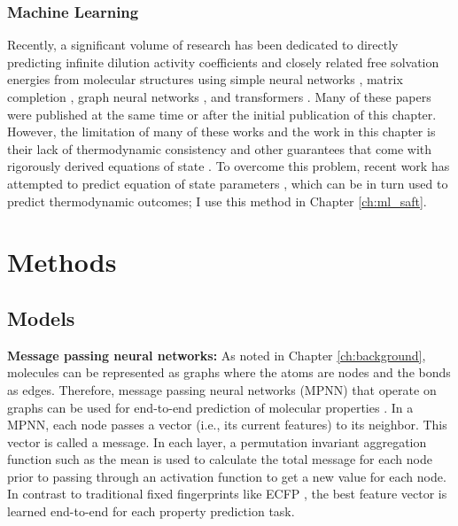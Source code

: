 \subsubsection{Machine Learning}

Recently, a significant volume of research has been dedicated to directly predicting infinite dilution activity coefficients and closely related free solvation energies from molecular structures using simple neural networks \cite{Urata2002, RamirezBeltran2009, Nami2011, Behrooz2017}, matrix completion \cite{Jirasek2020}, graph neural networks \cite{Grambow_2019, Vermeire2021, Chung2022, SanchezMedina2023a, Qin2023, Rittig2023, SanchezMedina2023b}, and transformers \cite{Winter2022, Winter2023}. Many of these papers were published at the same time or after the initial publication of this chapter. However, the limitation of many of these works and the work in this chapter is their lack of thermodynamic consistency and other guarantees that come with rigorously derived equations of state \cite{Rittig2023b}. To overcome this problem, recent work has attempted to predict equation of state parameters \cite{Abbasi2020, Madani2021, Abdallahelhadj2022, Winter2023, SanchezMedina2023b}, which can be in turn used to predict thermodynamic outcomes; I use this method in Chapter \ref{ch:ml_saft}.

\section{Methods}
\subsection{Models}

\noindent
\textbf{Message passing neural networks:} As noted in Chapter \ref{ch:background}, molecules can be represented as graphs where the atoms are nodes and the bonds as edges. Therefore, message passing neural networks (MPNN) that operate on graphs can be used for end-to-end prediction of molecular properties \cite{Gilmer2017}.  In a MPNN, each node passes a vector (i.e., its current features) to its neighbor. This  vector is called a message. In each layer, a permutation invariant aggregation function such as the mean is used to calculate the total message for each node prior to passing through an activation function to get a new value for each node.  In contrast to traditional fixed fingerprints like ECFP \cite{Rogers2010}, the best feature vector is learned end-to-end for each property prediction task.

